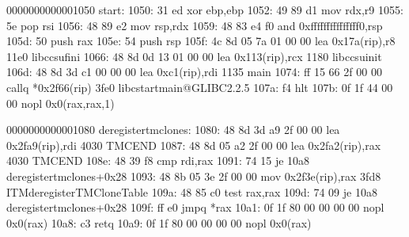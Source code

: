\documentclass[letterpaper,10pt,spanish]{sphinxmanual}
\begin{document}
\begin{sphinxVerbatim}[commandchars=\\\{\}]
0000000000001050 \PYGZlt{}\PYGZus{}start\PYGZgt{}:
    1050:   31 ed                   xor    \PYGZpc{}ebp,\PYGZpc{}ebp
    1052:   49 89 d1                mov    \PYGZpc{}rdx,\PYGZpc{}r9
    1055:   5e                      pop    \PYGZpc{}rsi
    1056:   48 89 e2                mov    \PYGZpc{}rsp,\PYGZpc{}rdx
    1059:   48 83 e4 f0             and    \PYGZdl{}0xfffffffffffffff0,\PYGZpc{}rsp
    105d:   50                      push   \PYGZpc{}rax
    105e:   54                      push   \PYGZpc{}rsp
    105f:   4c 8d 05 7a 01 00 00    lea    0x17a(\PYGZpc{}rip),\PYGZpc{}r8        \PYGZsh{} 11e0 \PYGZlt{}\PYGZus{}\PYGZus{}libc\PYGZus{}csu\PYGZus{}fini\PYGZgt{}
    1066:   48 8d 0d 13 01 00 00    lea    0x113(\PYGZpc{}rip),\PYGZpc{}rcx        \PYGZsh{} 1180 \PYGZlt{}\PYGZus{}\PYGZus{}libc\PYGZus{}csu\PYGZus{}init\PYGZgt{}
    106d:   48 8d 3d c1 00 00 00    lea    0xc1(\PYGZpc{}rip),\PYGZpc{}rdi        \PYGZsh{} 1135 \PYGZlt{}main\PYGZgt{}
    1074:   ff 15 66 2f 00 00       callq  *0x2f66(\PYGZpc{}rip)        \PYGZsh{} 3fe0 \PYGZlt{}\PYGZus{}\PYGZus{}libc\PYGZus{}start\PYGZus{}main@GLIBC\PYGZus{}2.2.5\PYGZgt{}
    107a:   f4                      hlt
    107b:   0f 1f 44 00 00          nopl   0x0(\PYGZpc{}rax,\PYGZpc{}rax,1)

0000000000001080 \PYGZlt{}deregister\PYGZus{}tm\PYGZus{}clones\PYGZgt{}:
    1080:   48 8d 3d a9 2f 00 00    lea    0x2fa9(\PYGZpc{}rip),\PYGZpc{}rdi        \PYGZsh{} 4030 \PYGZlt{}\PYGZus{}\PYGZus{}TMC\PYGZus{}END\PYGZus{}\PYGZus{}\PYGZgt{}
    1087:   48 8d 05 a2 2f 00 00    lea    0x2fa2(\PYGZpc{}rip),\PYGZpc{}rax        \PYGZsh{} 4030 \PYGZlt{}\PYGZus{}\PYGZus{}TMC\PYGZus{}END\PYGZus{}\PYGZus{}\PYGZgt{}
    108e:   48 39 f8                cmp    \PYGZpc{}rdi,\PYGZpc{}rax
    1091:   74 15                   je     10a8 \PYGZlt{}deregister\PYGZus{}tm\PYGZus{}clones+0x28\PYGZgt{}
    1093:   48 8b 05 3e 2f 00 00    mov    0x2f3e(\PYGZpc{}rip),\PYGZpc{}rax        \PYGZsh{} 3fd8 \PYGZlt{}\PYGZus{}ITM\PYGZus{}deregisterTMCloneTable\PYGZgt{}
    109a:   48 85 c0                test   \PYGZpc{}rax,\PYGZpc{}rax
    109d:   74 09                   je     10a8 \PYGZlt{}deregister\PYGZus{}tm\PYGZus{}clones+0x28\PYGZgt{}
    109f:   ff e0                   jmpq   *\PYGZpc{}rax
    10a1:   0f 1f 80 00 00 00 00    nopl   0x0(\PYGZpc{}rax)
    10a8:   c3                      retq
    10a9:   0f 1f 80 00 00 00 00    nopl   0x0(\PYGZpc{}rax)


\end{sphinxVerbatim}
\end{document}

